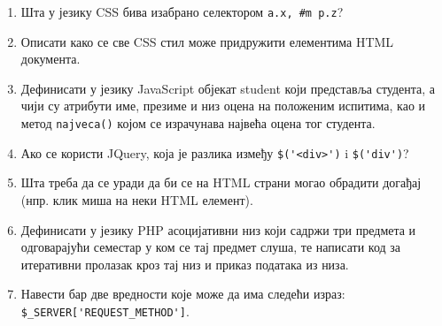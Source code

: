\documentclass[a4paper]{article}
\begin{document}
\begin{enumerate}
\hrulefill

\hrulefill

\hrulefill

\item Шта у језику CSS бива изабрано селектором \verb|а.x, #m p.z|?

\hrulefill

\hrulefill

\hrulefill

\item Описати како се све CSS стил може придружити елементима HTML
документа.

\hrulefill

\hrulefill

\hrulefill

\item Дефинисати у језику JavaScript објекат student који представља
  студента, а чији су атрибути име, презиме и низ оцена на положеним
  испитима, као и метод \verb|najveca()| којом се израчунава највећа
  оцена тог студента.

\hrulefill

\hrulefill

\hrulefill

\item Ако се користи JQuery, која је разлика између \verb|$('<div>')| i \verb|$('div')|?

\hrulefill

\hrulefill

\hrulefill

\item Шта треба да се уради да би се на HTML страни могао обрадити
  догађај (нпр. клик миша на неки HTML елемент).

\hrulefill

\hrulefill

\hrulefill

\item Дефинисати у језику PHP асоцијативни низ који садржи три предмета и
одговарајући семестар у ком се тај предмет слуша, те написати код за
итеративни пролазак кроз тај низ и приказ података из низа.

\hrulefill

\hrulefill

\hrulefill

\item Навести бар две вредности које може да има следећи израз:
\verb|$_SERVER['REQUEST_METHOD']|.

\hrulefill

\hrulefill


\end{enumerate}
\end{document}

